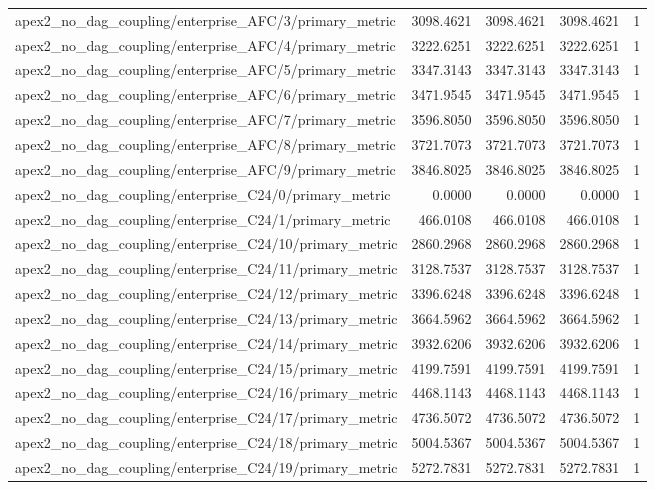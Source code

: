 \begin{table}[h]
\begin{tabular}{lrrrr}
apex2_no_dag_coupling/enterprise_AFC/3/primary_metric & 3098.4621 & 3098.4621 & 3098.4621 & 1 \\
apex2_no_dag_coupling/enterprise_AFC/4/primary_metric & 3222.6251 & 3222.6251 & 3222.6251 & 1 \\
apex2_no_dag_coupling/enterprise_AFC/5/primary_metric & 3347.3143 & 3347.3143 & 3347.3143 & 1 \\
apex2_no_dag_coupling/enterprise_AFC/6/primary_metric & 3471.9545 & 3471.9545 & 3471.9545 & 1 \\
apex2_no_dag_coupling/enterprise_AFC/7/primary_metric & 3596.8050 & 3596.8050 & 3596.8050 & 1 \\
apex2_no_dag_coupling/enterprise_AFC/8/primary_metric & 3721.7073 & 3721.7073 & 3721.7073 & 1 \\
apex2_no_dag_coupling/enterprise_AFC/9/primary_metric & 3846.8025 & 3846.8025 & 3846.8025 & 1 \\
apex2_no_dag_coupling/enterprise_C24/0/primary_metric & 0.0000 & 0.0000 & 0.0000 & 1 \\
apex2_no_dag_coupling/enterprise_C24/1/primary_metric & 466.0108 & 466.0108 & 466.0108 & 1 \\
apex2_no_dag_coupling/enterprise_C24/10/primary_metric & 2860.2968 & 2860.2968 & 2860.2968 & 1 \\
apex2_no_dag_coupling/enterprise_C24/11/primary_metric & 3128.7537 & 3128.7537 & 3128.7537 & 1 \\
apex2_no_dag_coupling/enterprise_C24/12/primary_metric & 3396.6248 & 3396.6248 & 3396.6248 & 1 \\
apex2_no_dag_coupling/enterprise_C24/13/primary_metric & 3664.5962 & 3664.5962 & 3664.5962 & 1 \\
apex2_no_dag_coupling/enterprise_C24/14/primary_metric & 3932.6206 & 3932.6206 & 3932.6206 & 1 \\
apex2_no_dag_coupling/enterprise_C24/15/primary_metric & 4199.7591 & 4199.7591 & 4199.7591 & 1 \\
apex2_no_dag_coupling/enterprise_C24/16/primary_metric & 4468.1143 & 4468.1143 & 4468.1143 & 1 \\
apex2_no_dag_coupling/enterprise_C24/17/primary_metric & 4736.5072 & 4736.5072 & 4736.5072 & 1 \\
apex2_no_dag_coupling/enterprise_C24/18/primary_metric & 5004.5367 & 5004.5367 & 5004.5367 & 1 \\
apex2_no_dag_coupling/enterprise_C24/19/primary_metric & 5272.7831 & 5272.7831 & 5272.7831 & 1 \\

\end{tabular}
\end{table}
